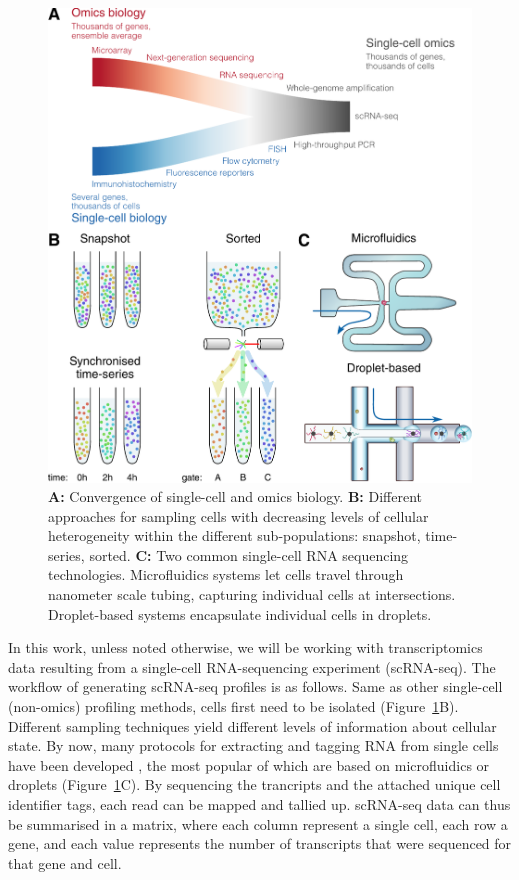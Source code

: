\begin{figure}[htb!]
	\centering
	\includegraphics[width=.7\linewidth]{fig/scomics_2.pdf} 
	\caption{
		\textbf{A:} Convergence of single-cell and omics biology.
		\textbf{B:} Different approaches for sampling cells with decreasing levels of cellular heterogeneity within the different sub-populations: snapshot, time-series, sorted.
		\textbf{C:} Two common single-cell RNA sequencing technologies. Microfluidics systems let cells travel through nanometer scale tubing, capturing individual cells at intersections. Droplet-based systems encapsulate individual cells in droplets.
	}
	\label{fig:profiling_convergence}
\end{figure}


In this work, unless noted otherwise, we will be working with transcriptomics data resulting from a single-cell RNA-sequencing experiment (scRNA-seq). The workflow of generating scRNA-seq profiles is as follows. Same as other single-cell (non-omics) profiling methods, cells first need to be isolated (Figure~\ref{fig:profiling_convergence}B). Different sampling techniques yield different levels of information about cellular state. By now, many protocols for extracting and tagging RNA from single cells have been developed \cite{svensson_exponentialscalingsinglecell_2018}, the most popular of which are based on microfluidics or droplets (Figure~\ref{fig:profiling_convergence}C). By sequencing the trancripts and the attached unique cell identifier tags, each read can be mapped and tallied up. scRNA-seq data can thus be summarised in a matrix, where each column represent a single cell, each row a gene, and each value represents the number of transcripts that were sequenced for that gene and cell.

